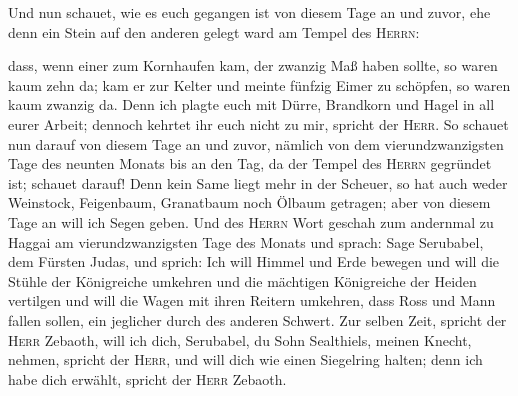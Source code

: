 Und nun schauet, wie es euch gegangen ist von diesem
Tage an und zuvor, ehe denn ein Stein auf den anderen gelegt ward am
Tempel des \textsc{Herrn}:

 dass, wenn einer zum Kornhaufen kam, der zwanzig Maß
haben sollte, so waren kaum zehn da; kam er zur Kelter und meinte
fünfzig Eimer zu schöpfen, so waren kaum zwanzig da. 
Denn ich plagte euch mit Dürre, Brandkorn und Hagel in all eurer Arbeit;
dennoch kehrtet ihr euch nicht zu mir, spricht der \textsc{Herr}.
 So schauet nun darauf von diesem Tage an und zuvor,
nämlich von dem vierundzwanzigsten Tage des neunten Monats bis an den
Tag, da der Tempel des \textsc{Herrn} gegründet ist; schauet darauf!
 Denn kein Same liegt mehr in der Scheuer, so hat auch
weder Weinstock, Feigenbaum, Granatbaum noch Ölbaum getragen; aber von
diesem Tage an will ich Segen geben.  Und des
\textsc{Herrn} Wort geschah zum andernmal zu Haggai am
vierundzwanzigsten Tage des Monats und sprach:  Sage
Serubabel, dem Fürsten Judas, und sprich: Ich will Himmel und Erde
bewegen  und will die Stühle der Königreiche umkehren und
die mächtigen Königreiche der Heiden vertilgen und will die Wagen mit
ihren Reitern umkehren, dass Ross und Mann fallen sollen, ein jeglicher
durch des anderen Schwert.  Zur selben Zeit, spricht der
\textsc{Herr} Zebaoth, will ich dich, Serubabel, du Sohn Sealthiels,
meinen Knecht, nehmen, spricht der \textsc{Herr}, und will dich wie
einen Siegelring halten; denn ich habe dich erwählt, spricht der
\textsc{Herr} Zebaoth.
